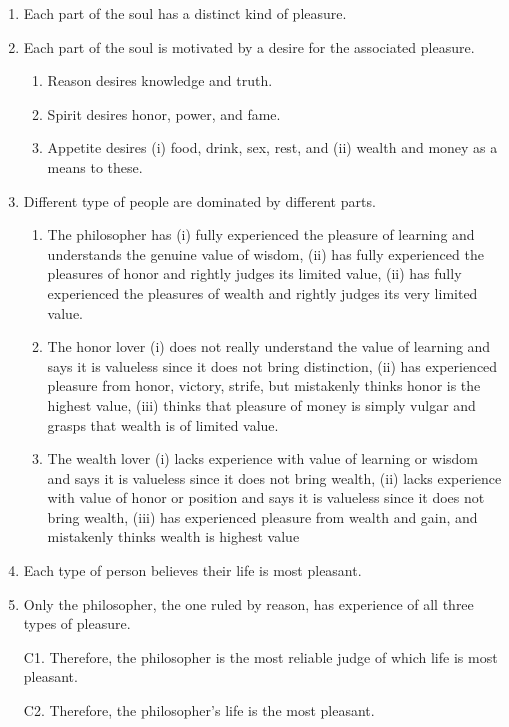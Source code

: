 \documentclass[oneside]{article}
\begin{document}
\begin{enumerate}
\item
  Each part of the soul has a distinct kind of pleasure.
  \item
  Each part of the soul is motivated by a desire for the associated pleasure.

  \begin{enumerate}
  \item
    Reason desires knowledge and truth.
  \item
    Spirit desires honor, power, and fame.
  \item
    Appetite desires (i) food, drink, sex, rest, and (ii) wealth and
    money as a means to these.
  \end{enumerate}
\item
  Different type of people are dominated by different parts.

  \begin{enumerate}
  \item
    The philosopher has (i) fully experienced the pleasure of learning
    and understands the genuine value of wisdom, (ii) has fully
    experienced the pleasures of honor and rightly judges its limited
    value, (ii) has fully experienced the pleasures of wealth and
    rightly judges its very limited value.
  \item
    The honor lover (i) does not really understand the value of learning
     and says it is valueless since it does not bring distinction,
    (ii) has experienced pleasure from honor, victory, strife, but
    mistakenly thinks honor is the highest value, (iii) thinks that
    pleasure of money is simply vulgar and grasps that wealth is of
    limited value.
  \item
    The wealth lover (i) lacks experience with value of learning or
    wisdom and says it is valueless since it does not bring wealth, (ii)
    lacks experience with value of honor or position and says it is
    valueless since it does not bring wealth, (iii) has experienced
    pleasure from wealth and gain, and mistakenly thinks wealth is
    highest value
  \end{enumerate}
\item
  Each type of person believes their life is most pleasant.
\item
  Only the philosopher, the one ruled by reason, has experience of all
  three types of pleasure. 
  \item[C1.] Therefore, the philosopher is the most
  reliable judge of which life is most pleasant. 
  \item[C2.] Therefore, the
  philosopher's life is the most pleasant.
\end{enumerate}
\end{document}

